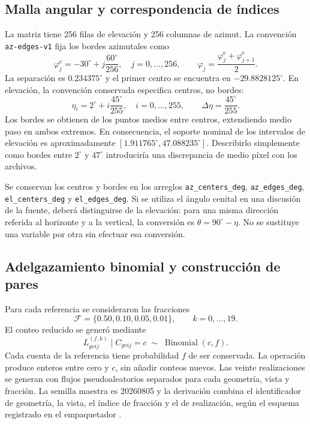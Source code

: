 \documentclass[11pt,a4paper]{article}
\begin{document}
\subsection{Malla angular y correspondencia de índices}

La matriz tiene 256 filas de elevación y 256 columnas de azimut. La convención \texttt{az-edges-v1} fija los bordes azimutales como
\begin{equation}
 \varphi^{\mathrm e}_j=-30^\circ+j\frac{60^\circ}{256},\quad j=0,\ldots,256,
 \qquad \varphi_j=\frac{\varphi^{\mathrm e}_j+\varphi^{\mathrm e}_{j+1}}{2}.
\end{equation}
La separación es $0.234375^\circ$ y el primer centro se encuentra en $-29.8828125^\circ$. En elevación, la convención conservada especifica centros, no bordes:
\begin{equation}
 \eta_i=2^\circ+i\frac{45^\circ}{255},\quad i=0,\ldots,255,
 \qquad \Delta\eta=\frac{45^\circ}{255}.
\end{equation}
Los bordes se obtienen de los puntos medios entre centros, extendiendo medio paso en ambos extremos. En consecuencia, el soporte nominal de los intervalos de elevación es aproximadamente $[1.911765^\circ,47.088235^\circ]$. Describirlo simplemente como bordes entre $2^\circ$ y $47^\circ$ introduciría una discrepancia de medio píxel con los archivos.

Se conservan los centros y bordes en los arreglos \texttt{az\_\allowbreak centers\_\allowbreak deg}, \texttt{az\_\allowbreak edges\_\allowbreak deg}, \texttt{el\_\allowbreak centers\_\allowbreak deg} y \texttt{el\_\allowbreak edges\_\allowbreak deg}. Si se utiliza el ángulo cenital en una discusión de la fuente, deberá distinguirse de la elevación: para una misma dirección referida al horizonte y a la vertical, la conversión es $\theta=90^\circ-\eta$. No se sustituye una variable por otra sin efectuar esa conversión.

\subsection{Adelgazamiento binomial y construcción de pares}

Para cada referencia se consideraron las fracciones
\begin{equation}
 \mathcal F=\{0.50,0.10,0.05,0.01\},\qquad k=0,\ldots,19.
\end{equation}
El conteo reducido se generó mediante
\begin{equation}
 L^{(f,k)}_{gvij}\mid C_{gvij}=c\;\sim\;\operatorname{Binomial}(c,f).
 \label{eq:binomial}
\end{equation}
Cada cuenta de la referencia tiene probabilidad $f$ de ser conservada. La operación produce enteros entre cero y $c$, sin añadir conteos nuevos. Las veinte realizaciones se generan con flujos pseudoaleatorios separados para cada geometría, vista y fracción. La semilla maestra es 20260805 y la derivación combina el identificador de geometría, la vista, el índice de fracción y el de realización, según el esquema registrado en el empaquetador \cite{datos}.
\end{document}
